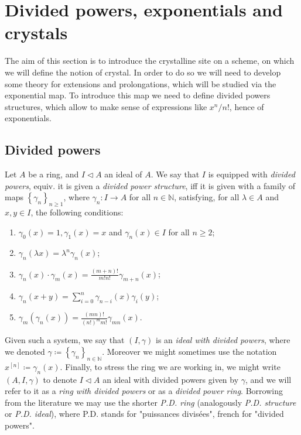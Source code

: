 \section{Divided powers, exponentials and crystals}
The aim of this section is to introduce the crystalline site on a scheme,
on which we will define the notion of crystal.
In order to do so we will need to develop some theory for extensions
and prolongations, which will be studied via the exponential map.
To introduce this map we need to define divided powers structures,
which allow to make sense of expressions like $x^n/n!$, hence of 
exponentials.



\subsection{Divided powers}
\begin{defn}\label{defn:dividedPowers}
	Let $A$ be a ring, and $I \triangleleft A$ an ideal of $A$.
	We say that $I$ is equipped with \emph{divided powers},
	equiv$.$ it is given a \emph{divided power structure}, iff
	it is given with a family of maps $\left\{ \gamma_n \right\}_{n \geq 1}$,
	where $\gamma_n\colon I \to A$ for all $n \in \mathbb{N}$,
	satisfying, for all $\lambda \in A$ and $x,y \in I$, the following conditions:
	\begin{enumerate}
		\item $\gamma_0(x) = 1, \gamma_1(x) = x$ and 
			$\gamma_n(x) \in I$ for all $n \geq 2$;
		\item $\gamma_n(\lambda x) = \lambda^n \gamma_n(x)$;
		\item $\gamma_n(x) \cdot \gamma_m(x) =
			\frac{\left( m + n \right)!}{m! n!} \gamma_{m+n}(x)$;
		\item $\gamma_n(x+y) = \sum_{i=0}^{n} \gamma_{n-i}(x) \gamma_i(y)$;
		\item $\gamma_m(\gamma_n(x)) = 
			\frac{\left( mn \right)!}{\left( n! \right)^m m!} \gamma_{mn}(x)$.
	\end{enumerate}
	Given such a system, we say that $(I,\gamma)$
	is an \emph{ideal with divided powers},
	where we denoted $\gamma \coloneqq \left\{ \gamma_n \right\}_{n \in \mathbb{N}}$.
	Moreover we might sometimes use the notation
	$x^{[n]} \coloneqq \gamma_n(x)$.
	Finally, to stress the ring we are working in, we might write
	$\left(A, I, \gamma\right)$ to denote $I \triangleleft A$
	an ideal with divided powers given by $\gamma$, and 
	we will refer to it as a \emph{ring with divided powers}
	or as a \emph{divided power ring}.
	Borrowing from the literature we may use the shorter \emph{P.D. ring}
	(analogously \emph{P.D. structure} or \emph{P.D. ideal}), where
	P.D. stands for "puissances divisées", french for "divided powers".
\end{defn}


